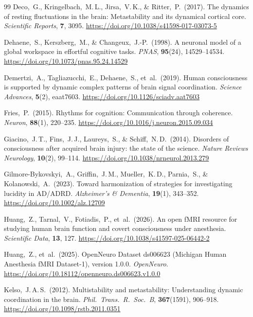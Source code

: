 \documentclass[11pt,a4paper]{article}
\theoremstyle{plain}
\theoremstyle{definition}
\theoremstyle{remark}
\begin{document}
\begin{thebibliography}{99}
Deco,~G., Kringelbach,~M.\,L., Jirsa,~V.\,K., \& Ritter,~P.\ (2017).
The dynamics of resting fluctuations in the brain: Metastability and its dynamical cortical core.
\textit{Scientific Reports}, \textbf{7}, 3095.
\url{https://doi.org/10.1038/s41598-017-03073-5}

Dehaene,~S., Kerszberg,~M., \& Changeux,~J.-P.\ (1998).
A neuronal model of a global workspace in effortful cognitive tasks.
\textit{PNAS}, \textbf{95}(24), 14529--14534.
\url{https://doi.org/10.1073/pnas.95.24.14529}

Demertzi,~A., Tagliazucchi,~E., Dehaene,~S., et~al.\ (2019).
Human consciousness is supported by dynamic complex patterns of brain signal coordination.
\textit{Science Advances}, \textbf{5}(2), eaat7603.
\url{https://doi.org/10.1126/sciadv.aat7603}

Fries,~P.\ (2015).
Rhythms for cognition: Communication through coherence.
\textit{Neuron}, \textbf{88}(1), 220--235.
\url{https://doi.org/10.1016/j.neuron.2015.09.034}

Giacino,~J.\,T., Fins,~J.\,J., Laureys,~S., \& Schiff,~N.\,D.\ (2014).
Disorders of consciousness after acquired brain injury: the state of the science.
\textit{Nature Reviews Neurology}, \textbf{10}(2), 99--114.
\url{https://doi.org/10.1038/nrneurol.2013.279}

Gilmore-Bykovskyi,~A., Griffin,~J.\,M., Mueller,~K.\,D., Parnia,~S., \& Kolanowski,~A.\ (2023).
Toward harmonization of strategies for investigating lucidity in AD/ADRD.
\textit{Alzheimer's \& Dementia}, \textbf{19}(1), 343--352.
\url{https://doi.org/10.1002/alz.12709}

Huang,~Z., Tarnal,~V., Fotiadis,~P., et~al.\ (2026).
An open fMRI resource for studying human brain function and covert consciousness under anesthesia.
\textit{Scientific Data}, \textbf{13}, 127.
\url{https://doi.org/10.1038/s41597-025-06442-2}

Huang,~Z., et~al.\ (2025).
OpenNeuro Dataset ds006623 (Michigan Human Anesthesia fMRI Dataset-1), version 1.0.0.
\textit{OpenNeuro}.
\url{https://doi.org/10.18112/openneuro.ds006623.v1.0.0}

Kelso,~J.\,A.\,S.\ (2012).
Multistability and metastability: Understanding dynamic coordination in the brain.
\textit{Phil.\ Trans.\ R.\ Soc.\ B}, \textbf{367}(1591), 906--918.
\url{https://doi.org/10.1098/rstb.2011.0351}


\end{thebibliography}
\end{document}
